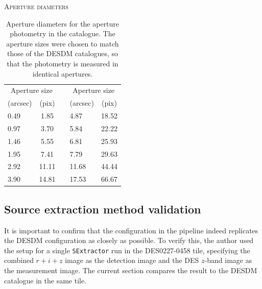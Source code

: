 \begin{table}[!htpb]
\centering
\textsc{Aperture diameters} \\
\vspace{0.1em}
\footnotesize
\begin{tabular}{lcclc}
\toprule\toprule
\multicolumn{2}{c}{Aperture size}  & &  \multicolumn{2}{c}{Aperture size} \\
(arcsec) & (pix) & & (arcsec) & (pix) \\
\midrule
0.49 & 1.85 & & 4.87 & 18.52 \\
0.97 & 3.70 & & 5.84 & 22.22 \\
1.46 & 5.55 & & 6.81 & 25.93 \\
1.95 & 7.41 & & 7.79 & 29.63 \\
2.92 & 11.11 & & 11.68 & 44.44 \\
3.90 & 14.81 & & 17.53 & 66.67 \\
\bottomrule
\end{tabular}
\vspace{1em}
\caption[Aperture diameters]{Aperture diameters for the aperture photometry in the \DESVIDEO catalogue. The aperture sizes were chosen to match those of the DESDM catalogues, so that the \DESVIDEO photometry is measured in identical apertures.}
\label{table:aperture_sizes}
\end{table}




\subsection{Source extraction method validation}\label{subsection:source_extract_validation}
It is important to confirm that the configuration in the \DESVIDEO pipeline indeed replicates the DESDM configuration as closely as possible. To verify this, the author used the \DESVIDEO setup for a single \texttt{SExtractor} run in the DES0227-0458 tile, specifying the combined $r+i+z$ image as the detection image and the DES $z$-band image as the measurement image. The current section compares the result to the DESDM catalogue in the same tile.  \par


